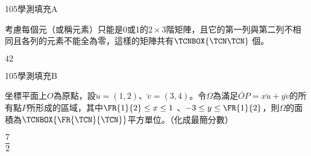 \begin{QUESTIONS}
    \begin{QUESTION}
        \begin{ExamInfo}{105}{學測}{填充}{A}
        \end{ExamInfo}
        \begin{ExamAnsRateInfo}{22}{47}{16}{3}
        \end{ExamAnsRateInfo}
        \begin{QBODY}
            考慮每個元（或稱元素）只能是0或1的$2\times 3$階矩陣，且它的第一列與第二列不相同且各列的元素不能全為零，這樣的矩陣共有$\TCNBOX{\TCN\TCN}$ 個。
        \end{QBODY}
        \begin{QFROMS}
        \end{QFROMS}
        \begin{QTAGS}\end{QTAGS}
        \begin{QANS}
            $42$
        \end{QANS}
        \begin{QSOLLIST}
        \end{QSOLLIST}
        \begin{QEMPTYSPACE}
        \end{QEMPTYSPACE}
    \end{QUESTION}
    \begin{QUESTION}
        \begin{ExamInfo}{105}{學測}{填充}{B}
        \end{ExamInfo}
        \begin{ExamAnsRateInfo}{22}{54}{11}{1}
        \end{ExamAnsRateInfo}
        \begin{QBODY}
            坐標平面上$O$為原點，設$\lvec{u}=(1,2)$、$\lvec{v}=(3,4)$。令$\Omega $為滿足$\lvec{OP}=x\lvec{u}+y\lvec{v}$的所有點$P$所形成的區域，其中$\FR{1}{2}\le x\le 1\ $、$-3\le y\le \FR{1}{2}$，則$\Omega $的面積為$\TCNBOX{\FR{\TCN}{\TCN}}$平方單位。（化成最簡分數）
        \end{QBODY}
        \begin{QFROMS}
        \end{QFROMS}
        \begin{QTAGS}\end{QTAGS}
        \begin{QANS}
            $\dfrac{7}{2}$

\end{QANS}
\end{QUESTION}
\end{QUESTIONS}
